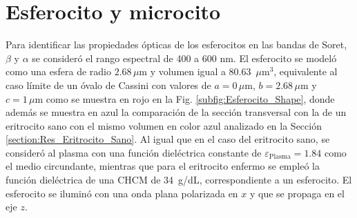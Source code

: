 
\section{Esferocito y microcito}
\label{section:Res_Esferocito}
\vspace{-0.5cm}

Para identificar las propiedades ópticas de los esferocitos en las bandas de Soret, $\beta$ y $\alpha$ se consideró el rango espectral de 400  a 600 nm. El esferocito se modeló como una esfera de radio $2.68\,\mu\text{m}$ y volumen igual a 80.63~$\mu\text{m}^3$, equivalente al caso límite de un óvalo de Cassini con valores de $a=0\,\mu\text{m}$, $b=2.68\,\mu\text{m}$ y $c=1\,\mu\text{m}$ como se muestra en rojo en la Fig. \ref{subfig:Esferocito_Shape}, donde además se muestra en azul la comparación de la sección transversal con la de un eritrocito sano con el mismo volumen en color azul analizado en la Sección \ref{section:Res_Eritrocito_Sano}. Al igual que en el caso del eritrocito sano, se consideró al plasma con una función dieléctrica constante de $\varepsilon_{\text{Plasma}}=1.84$ como el medio circundante, mientras que para el eritrocito enfermo se empleó la función dieléctrica de una CHCM de 34~g/dL, correspondiente a un esferocito. El esferocito se iluminó con una onda plana polarizada en $x$ y que se propaga en el eje $z$.

